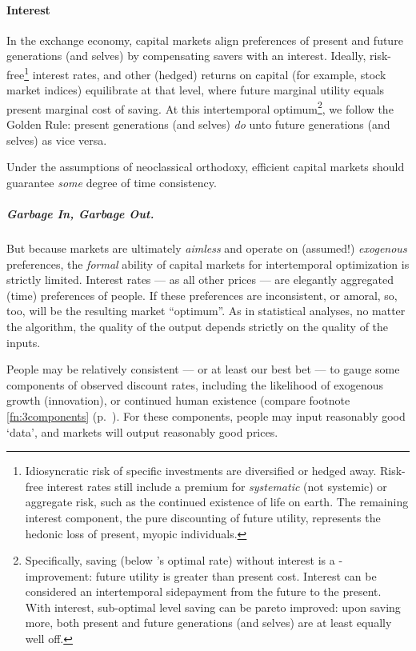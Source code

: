 \paragraph{Interest}  \label{sec:interest} In the exchange economy, capital markets align preferences of present and future generations (and selves) by compensating savers with an interest. Ideally, risk-free\footnote{
	Idiosyncratic risk of specific investments are diversified or hedged away. Risk-free interest rates still include a premium for \emph{systematic} (not systemic) or aggregate risk, such as the continued existence of life on earth. The remaining interest component, the pure discounting of future utility, represents the hedonic loss of present, myopic individuals.} 
interest rates, and other (hedged) returns on capital (for example, stock market indices) equilibrate at that level, where future marginal utility equals present marginal cost of saving. At this intertemporal optimum\footnote{
	Specifically, saving (below \citeauthor{Solow1956}'s optimal rate) without interest is a \citeauthor{Kaldor1939}-\citeauthor{Hicks1939} improvement: future utility is greater than present cost. Interest can be considered an intertemporal sidepayment from the future to the present. With interest, sub-optimal level saving can be pareto improved: upon saving more, both present and future generations (and selves) are at least equally well off.}, 
we follow the Golden Rule: present generations (and selves) \emph{do} unto future generations (and selves) as vice versa. 

Under the assumptions of neoclassical orthodoxy, efficient capital markets should guarantee \emph{some} degree of time consistency. 

\subparagraph{Garbage In, Garbage Out.} But because markets are ultimately \emph{aimless} and operate on (assumed!) \emph{exogenous} preferences, the \emph{formal} ability of capital markets for intertemporal optimization is strictly limited. Interest rates --- as all other prices --- are elegantly aggregated (time) preferences of people. If these preferences are inconsistent, or amoral, so, too, will be the resulting market ``optimum''. As in statistical analyses, no matter the algorithm, the quality of the output depends strictly on the quality of the inputs.

People may be relatively consistent --- or at least our best bet --- to gauge some components of observed discount rates, including the likelihood of exogenous growth (innovation), or continued human existence (compare footnote \ref{fn:3components} (p.~\pageref{fn:3components}). For these components, people may input reasonably good `data', and markets will output reasonably good prices.

